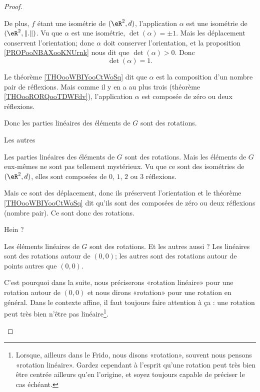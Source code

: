\begin{proof}
\begin{subproof}
            De plus, \( f\) étant une isométrie de \( (\eR^2,d)\), l'application \( \alpha\) est une isométrie de \( (\eR^2,\| . \|)\). Vu que \( \alpha\) est une isométrie, \( \det(\alpha)=\pm1\). Mais les déplacement conservent l'orientation; donc \( \alpha\) doit conserver l'orientation, et la proposition \ref{PROPooNBAXooKNUrnk} nous dit que \( \det(\alpha)>0\). Donc
            \begin{equation}
                \det(\alpha)=1.
            \end{equation}

            Le théorème \ref{THOooWBIYooCtWoSq} dit que \( \alpha\) est la composition d'un nombre pair de réflexions. Mais comme il y en a au plus trois (théorème \ref{THOooRORQooTDWFdv}), l'application \( \alpha\) est composée de zéro ou deux réflexions.

            Donc les parties linéaires des éléments de \( G\) sont des rotations.
           
        \item[Les autres]

            Les parties linéaires des éléments de \( G\) sont des rotations. Mais les éléments de \( G\) eux-mêmes ne sont pas tellement mystérieux. Vu que ce sont des isométries de \( (\eR^2,d)\), elles sont composées de \( 0\), \( 1\), \( 2\) ou \( 3\) réflexions.

            Mais ce sont des déplacement, donc ils préservent l'orientation et le théorème \ref{THOooWBIYooCtWoSq} dit qu'ils sont des composées de zéro ou deux réflexions (nombre pair). Ce sont donc des rotations.

        \item[Hein ?]

            Les éléments linéaires de \( G\) sont des rotations. Et les autres aussi ? Les linéaires sont des rotations autour de \( (0,0)\); les autres sont des rotations autour de points autres que \( (0,0)\).

            C'est pourquoi dans la suite, nous préciserons «rotation linéaire» pour une rotation autour de \( (0,0)\) et nous dirons «rotation» pour une rotation en général. Dans le contexte affine, il faut toujours faire attention à ça : une rotation peut très bien n'être pas linéaire\footnote{Lorsque, ailleurs dans le Frido, nous disons «rotation», souvent nous pensons «rotation linéaire». Gardez cependant à l'esprit qu'une rotation peut très bien être centrée ailleurs qu'en l'origine, et soyez toujours capable de préciser le cas échéant.}.


\end{subproof}
\end{proof}

